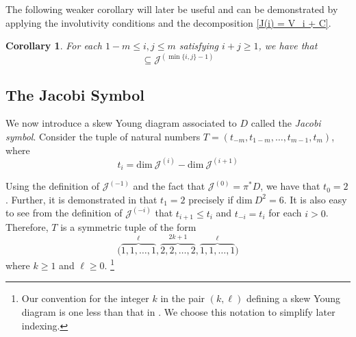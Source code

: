 \documentclass[11pt,letterpaper]{amsart}
\newcommand{\IZ}[1]{\todo[inline,color=red!40]{#1}}  %
\newtheorem{corollary}[theorem]{Corollary}
\numberwithin{equation}{section}
\begin{document}
The following weaker corollary will later be useful and can be demonstrated by applying the involutivity conditions and the decomposition \eqref{J(i) = V_i + C}.

\begin{corollary}
    \label{Corollary: Involutivity}
    For each $1-m\leq i,j  \leq m$ satisfying $i+j\geq 1$, we have that
    \begin{equation}
        [\mathcal{J}^{(i)},\mathcal{J}^{(j)}] \subseteq \mathcal{J}^{(\min\{i,j\}-1)}
    \end{equation}
\end{corollary}


\subsection{The Jacobi Symbol}
\label{subsection: Jacobi Symbol}

We now introduce a skew Young diagram associated to $D$ called the \textit{Jacobi symbol}. Consider the tuple of natural numbers $T=(t_{-m},t_{1-m},\ldots, t_{m-1}, t_m)$, where
\begin{equation}
\label{t_i}
    t_i = \mathrm{dim}\ \mathcal{J}^{(i)} - \mathrm{dim}\ \mathcal{J}^{(i+1)}
\end{equation}

 Using the definition of $\mathcal{J}^{(-1)}$ and the fact that $\mathcal{J}^{(0)}= \pi^*D$, we have that $t_0 = 2$. Further, it is demonstrated in \cite[Proposition 2]{doubrov2008rank3} that $t_1=2$ precisely if $\mathrm{dim}\ D^2 = 6$. It is also easy to see from the definition of $\mathcal{J}^{(-i)}$ that $t_{i+1}\leq t_i$ and $t_{-i} = t_i$ for each $i>0$. Therefore, $T$ is a symmetric tuple of the form
 \begin{equation}
    \big(
    \overbrace{1,1,\ldots,1}^{\ell},
    \overbrace{2,2,\ldots,2}^{2k+1},
    \overbrace{1,1,\ldots,1}^{\ell}
    \big)
 \end{equation}
 where $k\geq 1$ and $\ell\geq 0$. \footnote{Our convention for the integer $k$ in the pair $(k,\ell)$ defining a skew Young diagram is one less than that in \cite{doubrov2008rank3}. We choose this notation to simplify later indexing.} 
 
\end{document}
